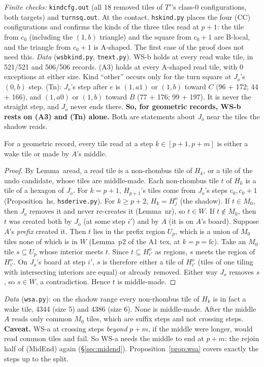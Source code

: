\documentclass[11pt]{article}
\theoremstyle{definition}\newtheorem{definition}[theorem]{Definition}\newtheorem{remark}[theorem]{Remark}
\begin{document}
\noindent\emph{Finite checks:} \texttt{kindcfg.out} (all 18 removed tiles of $T'$'s class-0 configurations, both targets) and \texttt{turnsq.out}. At the contact, \texttt{hskind.py} places the four (CC) configurations and confirms the kinds of the three tiles read at $p+1$: the tile from $c_0$ (including the $(1,b)$ triangle) and the square from $c_0+1$ are B-local, and the triangle from $c_0+1$ is A-shaped. The first case of the proof does not need this.
\emph{Data} (\texttt{wsbkind.py}, \texttt{tnext.py}). WS-b holds at every read wake tile, in 521/521 and 506/506 records. (A3) holds at every A-shaped read tile, with 0 exceptions at either size. Kind ``other'' occurs only for the turn square at $J_o$'s $(0,b)$ step. (Tn): $J_o$'s step after $e$ is $(1,a1)$ or $(1,b)$ toward $C$ (96 + 172; 44 + 166), and $(1,a0)$ or $(1,b)$ toward $B$ (77 + 176; 99 + 197). It is never the straight step, and $J_o$ never ends there.
\textbf{So, for geometric records, WS-b rests on (A3) and (Tn) alone.} Both are statements about $J_o$ near the tiles the shadow reads.

\begin{proposition}\label{prop:wsa}
For a geometric record, every tile read at a step $k\in[p+1,p+m]$ is either a wake tile or made by $A$'s middle.
\end{proposition}
\begin{proof}
By Lemma~aread, a read tile is a non-rhombus tile of $H_k$, or a tile of the undo candidate, whose tiles are middle-made. Each non-rhombus tile $t$ of $H_k$ is a tile of a hexagon of $J_o$. For $k=p+1$, $H_{p+1}$'s tiles come from $J_o$'s steps $c_0,c_0+1$ (Proposition~hs, \texttt{hsderive.py}). For $k\ge p+2$, $H_k=H^o_j$ (the shadow). If $t\in M_0$, then $J_o$ removes it and never re-creates it (Lemma~nr), so $t\in W$.
If $t\notin M_0$, then $t$ was created both by $J_o$ (at some step $i'$) and by $A$ (it is on $A$'s board). Suppose $A$'s \emph{prefix} created it. Then $t$ lies in the prefix region $U_p$, which is a union of $M_0$ tiles none of which is in $W$ (Lemma~p2 of the A1 tex, at $k=p=\mathrm{fc}$). Take an $M_0$ tile $s\subseteq U_p$ whose interior meets $t$. Since $t\subseteq H^o_{i'}$ as regions, $s$ meets the region of $H^o_{i'}$. On $J_o$'s board at step $i'$, $s$ is therefore either a tile of $H^o_{i'}$ (tiles of one tiling with intersecting interiors are equal) or already removed. Either way $J_o$ removes $s$, so $s\in W$, a contradiction. Hence $t$ is middle-made.
\end{proof}
\noindent\emph{Data} (\texttt{wsa.py}): on the shadow range every non-rhombus tile of $H_k$ is in fact a wake tile, 4344 (size 5) and 4386 (size 6). None is middle-made. After the middle $A$ reads only common $M_0$ tiles, which are suffix steps and not crossing steps.
\textbf{Caveat.} WS-a at crossing steps \emph{beyond} $p+m$, if the middle were longer, would read common tiles and fail. So WS-a needs the middle to end at $p+m$: the rejoin half of (MidEnd) again (\S\ref{sec:midend}). Proposition~\ref{prop:wsa} covers exactly the steps up to the split.
\end{document}
